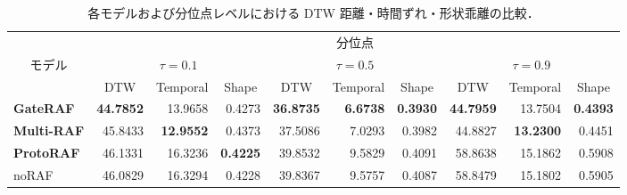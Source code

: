 \begin{table}[t]
  \caption{各モデルおよび分位点レベルにおける DTW 距離・時間ずれ・形状乖離の比較．}
  \label{tab:dtw_comparison}
  \centering
  \begin{tabular}{lrrrrrrrrr}
    \hline
    & \multicolumn{9}{c}{分位点} \\
    \cline{2-4} \cline{5-7} \cline{8-10} 
    \multicolumn{1}{c}{モデル} & \multicolumn{3}{c}{$\tau=0.1$} & \multicolumn{3}{c}{$\tau=0.5$} & \multicolumn{3}{c}{$\tau=0.9$} \\
    \cline{2-4} \cline{5-7} \cline{8-10} 
     & \multicolumn{1}{c}{DTW} & \multicolumn{1}{c}{Temporal} & \multicolumn{1}{c}{Shape} & \multicolumn{1}{c}{DTW} & \multicolumn{1}{c}{Temporal} & \multicolumn{1}{c}{Shape} & \multicolumn{1}{c}{DTW} & \multicolumn{1}{c}{Temporal} & \multicolumn{1}{c}{Shape} \\
    \hline\hline
    \textbf{GateRAF} & \textbf{44.7852} & 13.9658 & 0.4273 & \textbf{36.8735} & \textbf{6.6738} & \textbf{0.3930} & \textbf{44.7959} & 13.7504 & \textbf{0.4393} \\
    \textbf{Multi-RAF} & 45.8433 & \textbf{12.9552} & 0.4373 & 37.5086 & 7.0293 & 0.3982 & 44.8827 & \textbf{13.2300} & 0.4451 \\
    \textbf{ProtoRAF} & 46.1331 & 16.3236 & \textbf{0.4225} & 39.8532 & 9.5829 & 0.4091 & 58.8638 & 15.1862 & 0.5908 \\
    noRAF & 46.0829 & 16.3294 & 0.4228 & 39.8367 & 9.5757 & 0.4087 & 58.8479 & 15.1802 & 0.5905 \\
    \hline
  \end{tabular}
\end{table}
